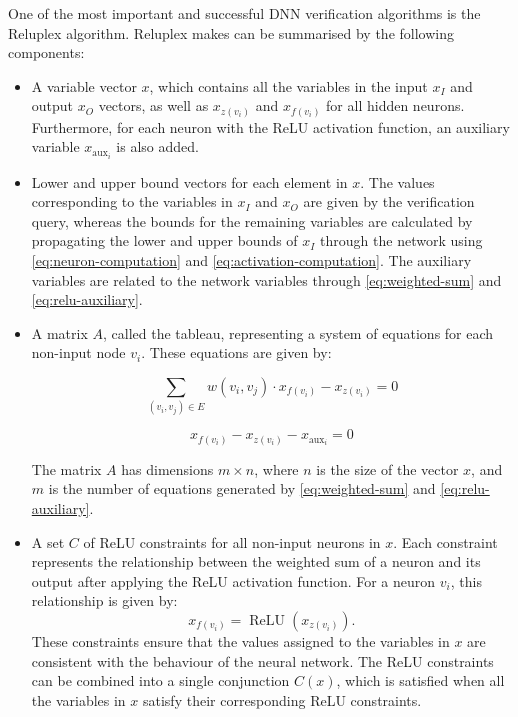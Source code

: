 One of the most important and successful DNN verification algorithms is the Reluplex algorithm. Reluplex makes can be summarised by the following components:

\begin{itemize}
    \item A variable vector $x$, which contains all the variables in the input $x_I$ and output $x_O$ vectors, as well as $x_{z(v_i)}$ and $x_{f(v_i)}$ for all hidden neurons. Furthermore, for each neuron with the ReLU activation function, an auxiliary variable $x_{\mathrm{aux}_i}$ is also added.

    \item Lower and upper bound vectors for each element in $x$. The values corresponding to the variables in $x_I$ and $x_O$ are given by the verification query, whereas the bounds for the remaining variables are calculated by propagating the lower and upper bounds of $x_I$ through the network using \autoref{eq:neuron-computation} and \autoref{eq:activation-computation}. The auxiliary variables are related to the network variables through \autoref{eq:weighted-sum} and \autoref{eq:relu-auxiliary}.

    \item A matrix $A$, called the tableau, representing a system of equations for each non-input node $v_i$. These equations are given by:

    \begin{equation}
        \sum_{(v_i, v_j) \in E}
        w(v_i, v_j) \cdot x_{f(v_i)}
        - x_{z(v_i)}
        = 0
        \label{eq:weighted-sum}
    \end{equation}

    \begin{equation}
        x_{f(v_i)}
        - x_{z(v_i)}
        - x_{\mathrm{aux}_i}
        = 0
        \label{eq:relu-auxiliary}
    \end{equation}

    The matrix $A$ has dimensions $m \times n$, where $n$ is the size of the vector $x$, and $m$ is the number of equations generated by \autoref{eq:weighted-sum} and \autoref{eq:relu-auxiliary}.

    \item A set $C$ of ReLU constraints for all non-input neurons in $x$. Each constraint represents the relationship between the weighted sum of a neuron and its output after applying the ReLU activation function. For a neuron $v_i$, this relationship is given by:
    \[
    x_{f(v_i)} = \operatorname{ReLU}(x_{z(v_i)}).
    \]
    These constraints ensure that the values assigned to the variables in $x$ are consistent with the behaviour of the neural network. The ReLU constraints can be combined into a single conjunction $C(x)$, which is satisfied when all the variables in $x$ satisfy their corresponding ReLU constraints.
\end{itemize}


